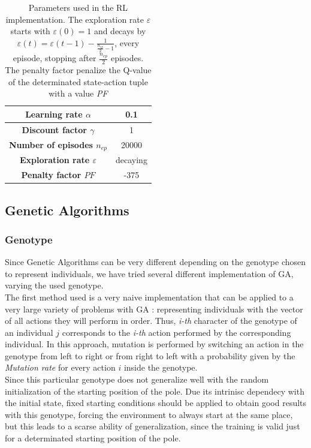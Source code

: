 \begin{table}[htb]%
	\centering
	\label{tab:RL_parameters}
	\begin{tabular}{|S|S|} 		%
		
		\hline
		{\textbf{Learning rate $\alpha$}} &  {0.1} \\
		\hline
		{\textbf{Discount factor $\gamma$}} & {1} \\
		\hline
		{\textbf{Number of episodes $n_{ep}$}} & {20000} \\
		\hline
		{\textbf{Exploration rate $\varepsilon$}}  & {decaying} \\
		\hline
		{\textbf{Penalty factor $PF$}}& {-375} \\
		\hline
		
	\end{tabular}
	\caption{Parameters used in the RL implementation. The exploration rate $\varepsilon$ starts with $\varepsilon(0)=1$ and decays by $\varepsilon(t) = \varepsilon(t - 1) - \frac{1}{\frac{n_{ep}}{2} - 1}$, every episode, stopping after $\frac{n_{ep}}{2}$ episodes. The penalty factor penalize the Q-value of the determinated state-action tuple with a value \textit{PF}}
\end{table}



\subsection{Genetic Algorithms}

\subsubsection{Genotype}
Since Genetic Algorithms can be very different depending on the genotype chosen to represent individuals, we have tried several different implementation of GA, varying the used genotype.
\\


The first method used is a very naive implementation that can be applied to a very large variety of problems with GA : representing individuals with the vector of all actions they will perform in order.
Thus, \textit{i-th} character of the genotype of an individual $j$ corresponds to the \textit{i-th} action performed by the corresponding individual.
In this approach, mutation is performed by switching an action in the genotype from left to right or from right to left with a probability given by the \textit{Mutation rate} for every action $i$ inside the genotype.
\\
Since this particular genotype does not generalize well with the random initialization of the starting position of the pole. Due its intrinisc dependecy with the initial state, fixed starting conditions should be applied to obtain good results with this genotype, forcing the environment to always start at the same place, but this leads to a scarse ability of generalization, since the training is valid just for a determinated starting position of the pole.

